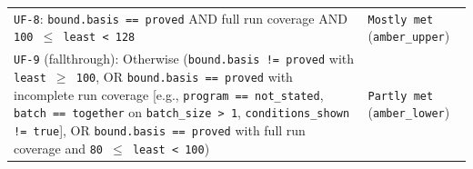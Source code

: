 \documentclass[11pt,letterpaper]{article}
\begin{document}
{\begin{longtable}{@{}>{\raggedright\arraybackslash}p{} >{\raggedright\arraybackslash}p{}@{}}
\texttt{UF-8}: \texttt{bound.\allowbreak{}basis == proved} AND full run coverage AND \texttt{100 $\le$ least < 128} & \texttt{Mostly met} (\texttt{amber\_\allowbreak{}upper}) \\
\texttt{UF-9} (fallthrough): Otherwise (\texttt{bound.\allowbreak{}basis != proved} with \texttt{least $\ge$ 100}, OR \texttt{bound.\allowbreak{}basis == proved} with incomplete run coverage [e.g., \texttt{program == not\_\allowbreak{}stated}, \texttt{batch == together} on \texttt{batch\_\allowbreak{}size > 1}, \texttt{conditions\_\allowbreak{}shown != true}], OR \texttt{bound.\allowbreak{}basis == proved} with full run coverage and \texttt{80 $\le$ least < 100}) & \texttt{Partly met} (\texttt{amber\_\allowbreak{}lower}) \\
\end{longtable}
}
\end{document}
